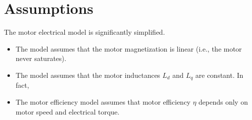 \documentclass[../SimBALink.tex]{subfiles}
\begin{document}
\section{Assumptions}
	The motor electrical model is significantly simplified.
	\begin{itemize}
		\item 
			The model assumes that the motor magnetization is linear (i.e., the motor never saturates).
		\item
			The model assumes that the motor inductances $L_d$ and $L_q$ are constant. In fact, 
		\item
			The motor efficiency model assumes that motor efficiency $\eta$ depends only on motor speed and electrical torque.
	\end{itemize}



\end{document}
